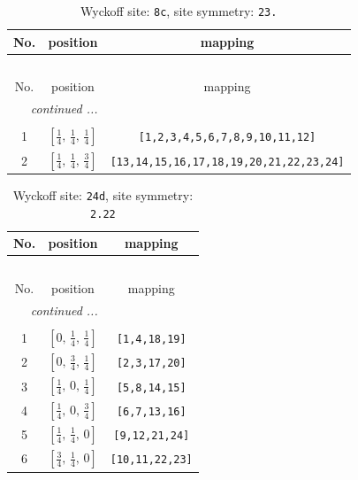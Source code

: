 \documentclass[fleqn,8pt]{jsarticle}
\begin{document}
\renewcommand{\arraystretch}{1.2}
\begin{longtable}{ccc}
\caption{Wyckoff site: {\tt 8c}, site symmetry: {\tt 23.}}
 \\
 \hline \hline
No. & position & mapping \\ \hline \endfirsthead

\multicolumn{2}{l}{\tablename\ \thetable{}} \\
 \hline \hline
No. & position & mapping \\ \hline \endhead

 \hline \hline
\multicolumn{2}{r}{\footnotesize\it continued ...} \\ \endfoot

 \hline \hline
\multicolumn{2}{r}{} \\ \endlastfoot

1 & $\left[ \frac{1}{4},\, \frac{1}{4},\, \frac{1}{4} \right]$ & {\tt [1,2,3,4,5,6,7,8,9,10,11,12]} \\ \hline
2 & $\left[ \frac{1}{4},\, \frac{1}{4},\, \frac{3}{4} \right]$ & {\tt [13,14,15,16,17,18,19,20,21,22,23,24]} \\
\end{longtable}
\renewcommand{\arraystretch}{1.2}
\begin{longtable}{ccc}
\caption{Wyckoff site: {\tt 24d}, site symmetry: {\tt 2.22}}
 \\
 \hline \hline
No. & position & mapping \\ \hline \endfirsthead

\multicolumn{2}{l}{\tablename\ \thetable{}} \\
 \hline \hline
No. & position & mapping \\ \hline \endhead

 \hline \hline
\multicolumn{2}{r}{\footnotesize\it continued ...} \\ \endfoot

 \hline \hline
\multicolumn{2}{r}{} \\ \endlastfoot

1 & $\left[ 0,\, \frac{1}{4},\, \frac{1}{4} \right]$ & {\tt [1,4,18,19]} \\ \hline
2 & $\left[ 0,\, \frac{3}{4},\, \frac{1}{4} \right]$ & {\tt [2,3,17,20]} \\ \hline
3 & $\left[ \frac{1}{4},\, 0,\, \frac{1}{4} \right]$ & {\tt [5,8,14,15]} \\ \hline
4 & $\left[ \frac{1}{4},\, 0,\, \frac{3}{4} \right]$ & {\tt [6,7,13,16]} \\ \hline
5 & $\left[ \frac{1}{4},\, \frac{1}{4},\, 0 \right]$ & {\tt [9,12,21,24]} \\ \hline
6 & $\left[ \frac{3}{4},\, \frac{1}{4},\, 0 \right]$ & {\tt [10,11,22,23]} \\
\end{longtable}
\end{document}
